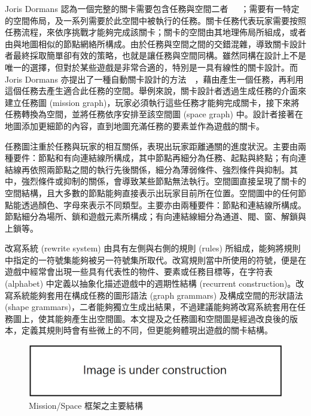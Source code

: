 Joris Dormans 認為一個完整的關卡需要包含任務與空間二者~\cite{dormans2010adventures}~\cite{dormans2011level}~\cite{dormans2012engineering}；需要有一特定的空間佈局，及一系列需要於此空間中被執行的任務。關卡任務代表玩家需要按照任務流程，來依序挑戰才能夠完成該關卡；關卡的空間由其地理佈局所組成，或者由與地圖相似的節點網絡所構成。由於任務與空間之間的交錯混雜，導致關卡設計者最終採取簡單卻有效的策略，也就是讓任務與空間同構。雖然同構在設計上不是唯一的選擇，但對於某些遊戲是非常合適的，特別是一具有線性的關卡設計。而 Joris Dormans 亦提出了一種自動關卡設計的方法~\cite{dormans2010adventures}~\cite{dormans2012engineering}，藉由產生一個任務，再利用這個任務去產生適合此任務的空間。舉例來說，關卡設計者透過生成任務的介面來建立任務圖 (mission graph)，玩家必須執行這些任務才能夠完成關卡，接下來將任務轉換為空間，並將任務依序安排至該空間圖 (space graph) 中。設計者接著在地圖添加更細節的內容，直到地圖充滿任務的要素並作為遊戲的關卡。

任務圖注重於任務與玩家的相互關係，表現出玩家距離通關的進度狀況。主要由兩種要件：節點和有向連結線所構成，其中節點再細分為任務、起點與終點；有向連結線再依照兩節點之間的執行先後關係，細分為薄弱條件、強烈條件與抑制。其中，強烈條件或抑制的關係，會導致某些節點無法執行。空間圖直接呈現了關卡的空間結構，且大多數的節點能夠直接表示出玩家目前所在位置。空間圖中的任何節點能透過顏色、字母來表示不同類型。主要亦由兩種要件：節點和連結線所構成。節點細分為場所、鎖和遊戲元素所構成；有向連結線細分為通道、閥、窗、解鎖與上鎖等。

改寫系統 (rewrite system) 由具有左側與右側的規則 (rules) 所組成，能夠將規則中指定的一符號集能夠被另一符號集所取代。改寫規則當中所使用的符號，便是在遊戲中經常會出現一些具有代表性的物件、要素或任務目標等，在字符表 (alphabet) 中定義以抽象化描述遊戲中的週期性結構 (recurrent construction)。改寫系統能夠套用在構成任務的圖形語法 (graph grammars) 及構成空間的形狀語法 (shape grammars)，二者能夠獨立生成出結果，不過建議能夠將改寫系統套用在任務圖上，使其能夠產生出空間圖。本文提及之任務圖和空間圖是經過改良後的版本，定義其規則時會有些微上的不同，但更能夠體現出遊戲的關卡結構。

\begin{figure}[!htb]
  \begin{center}
    \includegraphics[width=1.0\textwidth]{figures/under_construction.png}
    \caption{Mission/Space 框架之主要結構} 
    \label{fig:structure-of-mission-space-framework}
  \end{center}
\end{figure}

